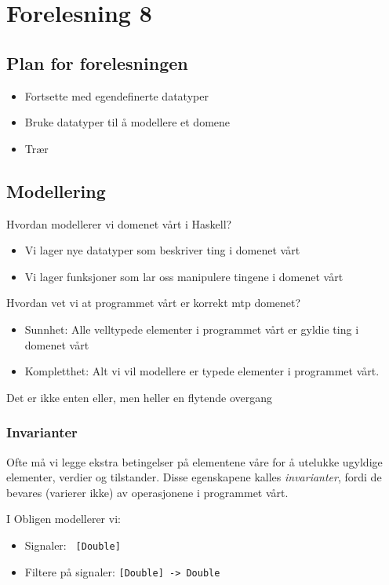 \documentclass{article}
\begin{document}
    \section{Forelesning 8}
    \subsection{Plan for forelesningen}

    \begin{itemize}
        \item Fortsette med egendefinerte datatyper
        \item Bruke datatyper til å modellere et domene
        \item Trær
    \end{itemize}

    \subsection{Modellering}
    Hvordan modellerer vi domenet vårt i Haskell?
    \begin{itemize}
        \item Vi lager nye datatyper som beskriver ting i domenet vårt
        \item Vi lager funksjoner som lar oss manipulere tingene i domenet vårt
    \end{itemize}

    Hvordan vet vi at programmet vårt er korrekt mtp domenet?
    \begin{itemize}
        \item Sunnhet: Alle velltypede elementer i programmet vårt er gyldie ting i domenet vårt
        \item Kompletthet: Alt vi vil modellere er typede elementer i programmet vårt.
    \end{itemize}

    Det er ikke enten eller, men heller en flytende overgang

    \subsubsection{Invarianter}
    Ofte må vi legge ekstra betingelser på elementene våre for å utelukke ugyldige elementer, verdier og tilstander. Disse egenskapene kalles \textit{invarianter}, fordi de bevares (varierer ikke) av operasjonene i programmet vårt.

    \begin{eg}
        I Obligen modellerer vi:

        \begin{itemize}
            \item Signaler: \texttt{ [Double]}
            \item Filtere på signaler: \texttt{[Double] -> Double} 
        \end{itemize}
    \end{eg}
\end{document}
